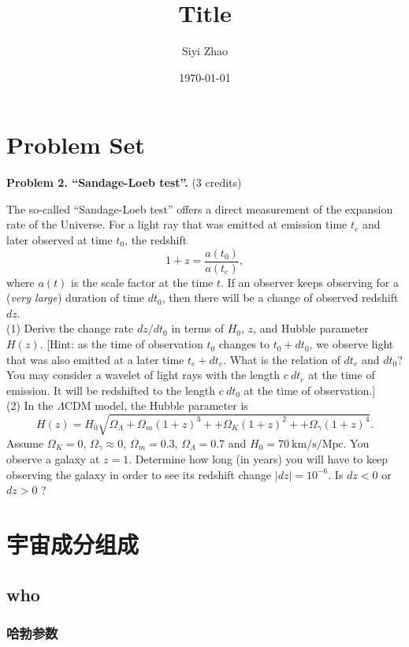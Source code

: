 \documentclass[]{ctexart}
\title{Title}
\author{Siyi Zhao}
\date{\today}
\begin{document}
\maketitle

\tableofcontents

\section*{Problem Set}

\textbf{Problem 2. “Sandage-Loeb test”.} (3 credits)

The so-called “Sandage-Loeb test” offers a direct measurement of the expansion
rate of the Universe. For a light ray that was emitted at emission time $t_e$ and later observed at time $t_0$, the redshift
$$1+z=\frac{a\left(t_{0}\right)}{a\left(t_{e}\right)},$$
where $a\left(t\right)$ is the scale factor at the time $t$. If an observer keeps observing for a (\emph{very large}) duration of time $dt_0$, then there will be a change of observed redshift $dz$.
\\(1) Derive the change rate $d z / d t_{0}$  in terms of $H_0$, $z$, and Hubble parameter $H(z)$. [Hint: as the time of observation $t_0$ changes to $t_0 + dt_0$, we observe light that was also emitted at a later time $t_e + dt_e$. What is the relation of $dt_e$ and $dt_0$? You may consider a wavelet of light rays with the length $c\ dt_e$ at the time of emission. It will be redshifted to the length $c\ dt_0$ at the time of observation.]
\\(2) In the $\Lambda$CDM model, the Hubble parameter is
$$
H(z)=H_{0} \sqrt{\Omega_{\Lambda}+\Omega_{m}(1+z)^{3}++\Omega_{K}(1+z)^{2}++\Omega_{\gamma}(1+z)^{4}} .
$$ 
Assume $\Omega_{K}=0$, $\Omega_{\gamma} \approx 0$, $\Omega_{m}=0.3$, $\Omega_{\Lambda}=0.7$ and $H_{0}=70 \mathrm{~km} / \mathrm{s} / \mathrm{Mpc}$. You
observe a galaxy at $z = 1$. Determine how long (in years) you will have to keep observing the galaxy in order to see its redshift change $|d z|=10^{-6}$. Is $d z<0$  or $d z>0$ ?

\section{宇宙成分组成}

\subsection{who}

\subsubsection{哈勃参数}
\end{document}
